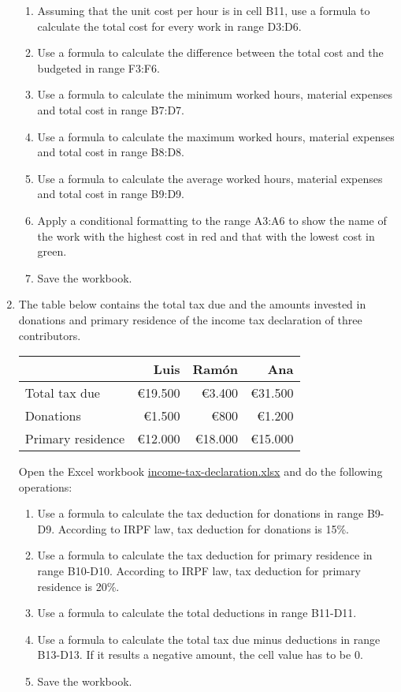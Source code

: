 \begin{enumerate}[leftmargin=*,resume]
\begin{enumerate}
\item Assuming that the unit cost per hour is in cell B11, use a formula to calculate the total cost for every work in
range D3:D6.
\item Use a formula to calculate the difference between the total cost and the budgeted in range F3:F6.
\item Use a formula to calculate the minimum worked hours, material expenses and total cost in range B7:D7.
\item Use a formula to calculate the maximum worked hours, material expenses and total cost in range B8:D8.
\item Use a formula to calculate the average worked hours, material expenses and total cost in range B9:D9.
\item Apply a conditional formatting to the range A3:A6 to show the name of the work with the highest cost in red and
that with the lowest cost in green. 
\item Save the workbook. 
\end{enumerate}

\item The table below contains the total tax due and the amounts invested in donations and primary residence of the
income tax declaration of three contributors.
\begin{center}
\begin{tabular}{lrrr}
\toprule
 & Luis & Ramón & Ana\\
\midrule
Total tax due & €19.500 & €3.400 & €31.500\\
Donations & €1.500 & €800 & €1.200\\
Primary residence & €12.000 & €18.000 & €15.000\\
\bottomrule
\end{tabular}
\end{center}

Open the Excel workbook
\href{http://aprendeconalf.es/office/excel/exercises/formulas/income-tax-declaration.xlsx}{\textsf{income-tax-declaration.xlsx}}
and do the following operations:

\begin{enumerate}
\item Use a formula to calculate the tax deduction for donations in range B9-D9. According to IRPF law, tax deduction
for donations is 15\%.
\item Use a formula to calculate the tax deduction for primary residence in range B10-D10. According to IRPF law, tax deduction
for primary residence is 20\%.
\item Use a formula to calculate the total deductions in range B11-D11. 
\item Use a formula to calculate the total tax due minus deductions in range B13-D13. If it results a negative amount,
the cell value has to be 0. 
\item Save the workbook. 
\end{enumerate}



\end{enumerate}
